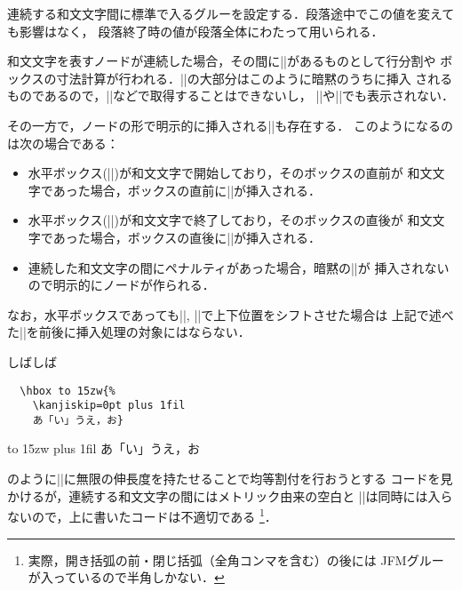 \documentclass[a4paper,11pt,nomag,dvipdfmx]{jsarticle}
\begin{document}
\begin{cslist}
\csitem[\.{kanjiskip}=<skip>]
  連続する和文文字間に標準で入るグルーを設定する．段落途中でこの値を変えても影響はなく，
  段落終了時の値が段落全体にわたって用いられる．
\end{cslist}

\begin{dangerous}
 和文文字を表すノードが連続した場合，その間に|\kanjiskip|があるものとして行分割や
 ボックスの寸法計算が行われる．|\kanjiskip|の大部分はこのように暗黙のうちに挿入
 されるものであるので，|\lastskip|などで取得することはできないし，
 |\showlists|や|\showbox|でも表示されない．

  その一方で，ノードの形で明示的に挿入される|\kanjiskip|も存在する．
  このようになるのは次の場合である：
 \begin{itemize}
  \item 水平ボックス(|\hbox|)が和文文字で開始しており，そのボックスの直前が
    和文文字であった場合，ボックスの直前に|\kanjiskip|が挿入される．
  \item 水平ボックス(|\hbox|)が和文文字で終了しており，そのボックスの直後が
    和文文字であった場合，ボックスの直後に|\kanjiskip|が挿入される．
  \item 連続した和文文字の間にペナルティがあった場合，暗黙の|\kanjiskip|が
    挿入されないので明示的にノードが作られる．
 \end{itemize}
 なお，水平ボックスであっても|\raise|, |\lower|で上下位置をシフトさせた場合は
 上記で述べた|\kanjiskip|を前後に挿入処理の対象にはならない．
\end{dangerous}
\begin{dangerous}
  しばしば

  \medskip
  \begin{minipage}{.6\linewidth}
  \begin{verbatim}
  \hbox to 15zw{%
    \kanjiskip=0pt plus 1fil
    あ「い」うえ，お}
  \end{verbatim}
  \end{minipage}\hfill
  \begin{minipage}{.3\linewidth}
  \hbox to 15zw{%
    \kanjiskip=0pt plus 1fil
    あ「い」うえ，お}
  \end{minipage}

  \noindent
  のように|\kanjiskip|に無限の伸長度を持たせることで均等割付を行おうとする
  コードを見かけるが，連続する和文文字の間にはメトリック由来の空白と
  |\kanjiskip|は同時には入らないので，上に書いたコードは不適切である
 \footnote{実際，開き括弧の前・閉じ括弧（全角コンマを含む）の後には
 JFMグルーが入っているので半角しかない．
 }．
\end{dangerous}
\end{document}
